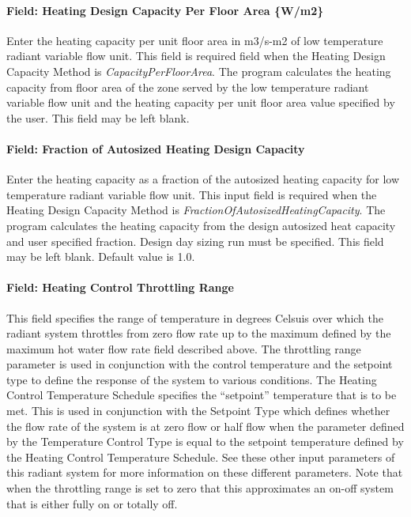 \paragraph{Field: Heating Design Capacity Per Floor Area \{W/m2\}}\label{field-heating-design-capacity-per-floor-area-wm2-5}

Enter the heating capacity per unit floor area in m3/s-m2 of low temperature radiant variable flow unit. This field is required field when the Heating Design Capacity Method is \emph{CapacityPerFloorArea}. The program calculates the heating capacity from floor area of the zone served by the low temperature radiant variable flow unit and the heating capacity per unit floor area value specified by the user. This field may be left blank.

\paragraph{Field: Fraction of Autosized Heating Design Capacity}\label{field-fraction-of-autosized-heating-design-capacity-5}

Enter the heating capacity as a fraction of the autosized heating capacity for low temperature radiant variable flow unit. This input field is required when the Heating Design Capacity Method is \emph{FractionOfAutosizedHeatingCapacity}. The program calculates the heating capacity from the design autosized heat capacity and user specified fraction. Design day sizing run must be specified. This field may be left blank. Default value is 1.0.

\paragraph{Field: Heating Control Throttling Range}\label{field-heating-control-throttling-range}

This field specifies the range of temperature in degrees Celsuis over which the radiant system throttles from zero flow rate up to the maximum defined by the maximum hot water flow rate field described above. The throttling range parameter is used in conjunction with the control temperature and the setpoint type to define the response of the system to various conditions. The Heating Control Temperature Schedule specifies the ``setpoint'' temperature that is to be met.  This is used in conjunction with the Setpoint Type which defines whether the flow rate of the system is at zero flow or half flow when the parameter defined by the Temperature Control Type is equal to the setpoint temperature defined by the Heating Control Temperature Schedule.  See these other input parameters of this radiant system for more information on these different parameters.  Note that when the throttling range is set to zero that this approximates an on-off system that is either fully on or totally off.

